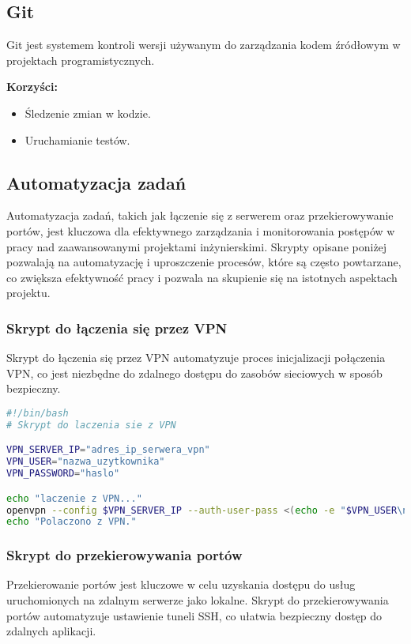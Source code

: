 \documentclass[12pt,twoside]{article}
\begin{document}
\subsection{Git}
Git jest systemem kontroli wersji używanym do zarządzania kodem źródłowym w projektach programistycznych.

\textbf{Korzyści:}
\begin{itemize}
	\item Śledzenie zmian w kodzie.
	\item Uruchamianie testów.
\end{itemize}


\subsection{Automatyzacja zadań}
Automatyzacja zadań, takich jak łączenie się z serwerem oraz przekierowywanie portów, jest kluczowa dla efektywnego zarządzania i monitorowania postępów w pracy nad zaawansowanymi projektami inżynierskimi. Skrypty opisane poniżej pozwalają na automatyzację i uproszczenie procesów, które są często powtarzane, co zwiększa efektywność pracy i pozwala na skupienie się na istotnych aspektach projektu.


\subsubsection{Skrypt do łączenia się przez VPN}
Skrypt do łączenia się przez VPN automatyzuje proces inicjalizacji połączenia VPN, co jest niezbędne do zdalnego dostępu do zasobów sieciowych w sposób bezpieczny.

\begin{lstlisting}[language=bash, caption=Skrypt do łączenia się przez VPN]
#!/bin/bash
# Skrypt do laczenia sie z VPN

VPN_SERVER_IP="adres_ip_serwera_vpn"
VPN_USER="nazwa_uzytkownika"
VPN_PASSWORD="haslo"

echo "laczenie z VPN..."
openvpn --config $VPN_SERVER_IP --auth-user-pass <(echo -e "$VPN_USER\n$VPN_PASSWORD")
echo "Polaczono z VPN."
\end{lstlisting}

\subsubsection{Skrypt do przekierowywania portów}
Przekierowanie portów jest kluczowe w celu uzyskania dostępu do usług uruchomionych na zdalnym serwerze jako lokalne. Skrypt do przekierowywania portów automatyzuje ustawienie tuneli SSH, co ułatwia bezpieczny dostęp do zdalnych aplikacji.
\end{document}
